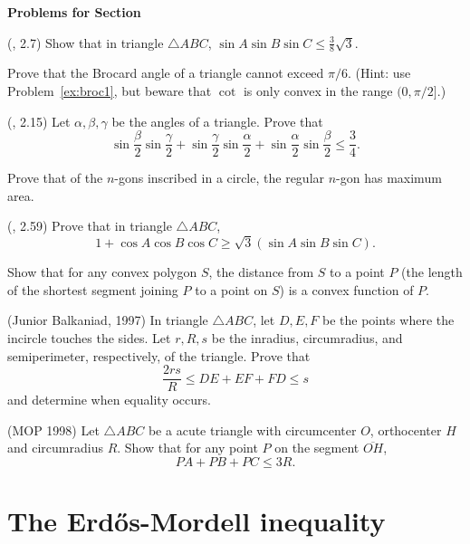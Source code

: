\documentclass[12pt]{book}
\newcounter{exc}
\numberwithin{exc}{section}
\numberwithin{figure}{section}
\newenvironment{exer}{\vspace{0.1in}
\noindent \textbf{Problems for Section~\thesection} \vspace{0.1in}
\begin{list}{\arabic{exc}.}{\usecounter{exc}}}{\end{list}}
\numberwithin{equation}{theorem}
\def\ii{\item}
\def\seg#1{\overline{#1}}
\begin{document}
\begin{exer}
\ii
(\cite{bib:bott}, 2.7)
Show that in triangle $\triangle ABC$, $\sin A \sin B \sin C \leq \frac{3}{8}
\sqrt{3}$.
\ii
Prove that the Brocard angle 
of a triangle cannot exceed $\pi/6$. (Hint: use 
Problem~\ref{ex:broc1}, but beware that 
$\cot$ is only convex in the range $(0, \pi/2]$.)
\ii (\cite{bib:bott}, 2.15)
Let $\alpha, \beta, \gamma$ be the angles of a triangle. Prove that
\[
\sin \frac{\beta}{2} \sin \frac{\gamma}{2} +
\sin \frac{\gamma}{2} \sin \frac{\alpha}{2} +
\sin \frac{\alpha}{2} \sin \frac{\beta}{2}  \leq \frac 34.
\]
\ii
Prove that of the $n$-gons inscribed in a circle, the regular $n$-gon 
has maximum area.
\ii (\cite{bib:bott}, 2.59)
Prove that in triangle $\triangle ABC$,
\[
1 + \cos A \cos B \cos C \geq \sqrt{3} (\sin A \sin B \sin C ).
\]
\ii
Show that for any convex polygon $S$, the distance from $S$ to a 
point $P$ (the length of the shortest segment joining $P$ to a point 
on $S$) is a convex function of $P$.
\ii (Junior Balkaniad, 1997)
In triangle $\triangle ABC$, let $D,E,F$ be the points where the incircle 
touches the sides. Let $r, R, s$ be the inradius, circumradius, and 
semiperimeter, respectively, of the triangle. Prove that
\[
\frac{2rs}{R} \leq DE + EF + FD \leq s
\]
and determine when equality occurs.
\ii (MOP 1998)
Let $\triangle ABC$ be a acute triangle with circumcenter $O$, 
orthocenter $H$ and circumradius $R$.
Show that for any point $P$ on the segment $\seg{OH}$,
\[
PA + PB + PC \leq 3R.
\]
\end{exer}

\section{The Erd\H{o}s-Mordell inequality} 
\label{sec:em}
\end{document}
